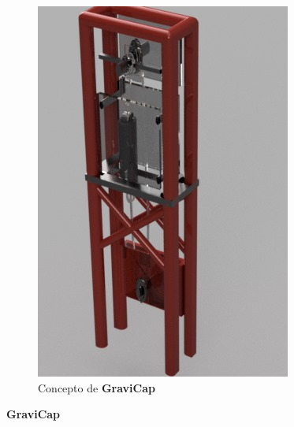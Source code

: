 \begin{figure}[H]
\begin{subfigure}[b]{0.3\textwidth}
                    \includegraphics[width=\textwidth]{Estructura/Concepto.png}
                    \caption{Concepto de \textcolor{dark_violet}{\textbf{GraviCap}}}
                    \label{fig:e1.2}
                \end{subfigure}
                \caption{\textcolor{dark_violet}{\textbf{GraviCap}}}
                \label{fig:e1}
            \end{figure}
            
